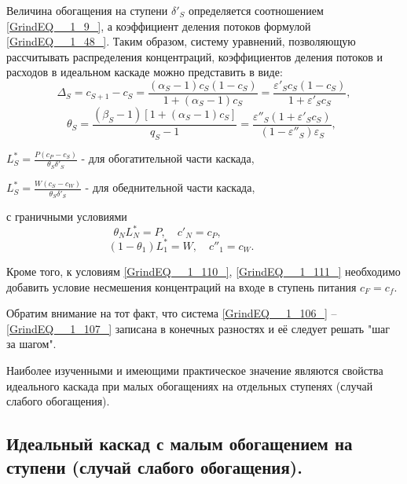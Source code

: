 Величина обогащения на ступени $\delta '_{S} $ определяется соотношением \ref{GrindEQ__1_9_}, а коэффициент деления потоков формулой \ref{GrindEQ__1_48_}. Таким образом, систему уравнений, позволяющую рассчитывать распределения концентраций, коэффициентов деления потоков и расходов в идеальном каскаде можно представить в виде:
\begin{equation} \label{GrindEQ__1_106_} 
\Delta _{S} =c_{S+1} -c_{S} =\frac{(\alpha _{S} -1)c_{S} (1-c_{S} )}{1+(\alpha _{S} -1)c_{S} } =\frac{\varepsilon '_{S} c_{S} (1-c_{S} )}{1+\varepsilon '_{S} c_{S} } , 
\end{equation} 
\begin{equation} \label{GrindEQ__1_107_} 
\theta _{S} =\frac{(\beta _{S} -1)\left[1+(\alpha _{S} -1)c_{S} \right]}{q_{S} -1} =\frac{\varepsilon ''_{S} (1+\varepsilon '_{S} c_{S} )}{(1-\varepsilon ''_{S} )\varepsilon _{S} } ,~              ~ 
\end{equation} 

$L_{S}^{*} =\frac{P(c_{P} -c_{S} )}{\theta _{S} \delta '_{S} } $ - для обогатительной части каскада,

\noindent $L_{S}^{*} =\frac{W(c_{S} -c_{W} )}{\theta _{S} \delta '_{S} } $ - для обеднительной части каскада,

с граничными условиями
\begin{equation} \label{GrindEQ__1_110_} 
\theta _{N} L_{N}^{*} =P,\quad c'_{N} =c_{P} ,~~~~~~~~~~~~~~~~~~~~~~~~~~~~~~ 
\end{equation} 
\begin{equation} \label{GrindEQ__1_111_} 
(1-\theta _{1} )L_{1}^{*} =W,\quad c''_{1} =c_{W} .~~~~~~~~~~~~~~~~~~~ 
\end{equation} 

Кроме того, к условиям \ref{GrindEQ__1_110_}, \ref{GrindEQ__1_111_} необходимо добавить условие несмешения концентраций на входе в ступень питания $c_{F} =c_{f} $.

Обратим внимание на тот факт, что система \ref{GrindEQ__1_106_} -- \ref{GrindEQ__1_107_} записана в конечных разностях и её следует решать "шаг за шагом".

Наиболее изученными и имеющими практическое значение являются свойства идеального каскада при малых обогащениях на отдельных ступенях (случай слабого обогащения).

\subsection{Идеальный каскад с малым обогащением на ступени (случай слабого обогащения).}

